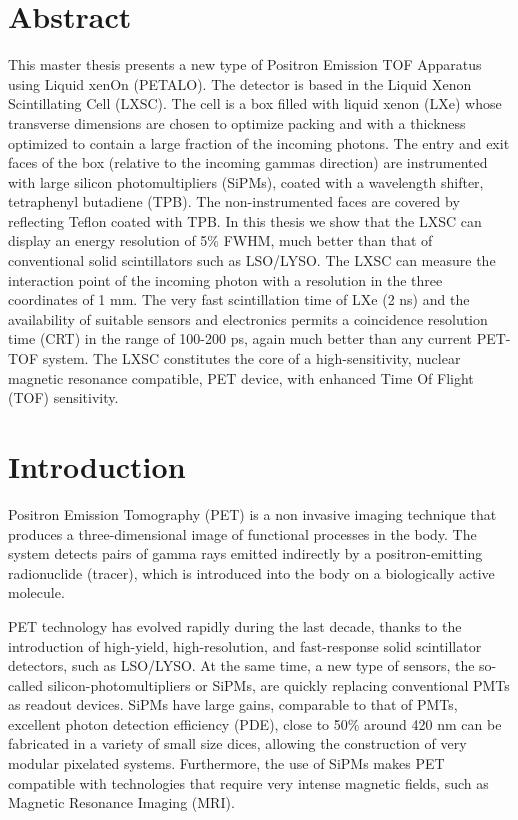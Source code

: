 \documentclass[12pt,a4paper,english,twoside]{article}
\begin{document}
\section*{Abstract}
This master thesis presents a new type of Positron Emission TOF Apparatus using Liquid xenOn (PETALO). The detector is based in the  Liquid Xenon Scintillating Cell (LXSC).  The cell is a box filled with liquid xenon (LXe) whose transverse dimensions are chosen to optimize packing and with a thickness optimized to contain a large fraction of the incoming photons. The entry and exit faces of the box (relative to the incoming gammas direction) are instrumented with large silicon photomultipliers (SiPMs), coated with a wavelength shifter, tetraphenyl butadiene (TPB). The non-instrumented faces are covered by reflecting Teflon coated with TPB. In this thesis we show that the LXSC can display an energy resolution of 5\% FWHM, much better than that of conventional solid scintillators such as LSO/LYSO. The LXSC can measure the interaction point of the incoming photon with a resolution in the three coordinates of 1 mm. The very fast scintillation time of LXe (2 ns) and the availability of suitable sensors and electronics permits a coincidence resolution time (CRT) in the range of 100-200 ps, again much better than any current PET-TOF system. The LXSC constitutes the core of a high-sensitivity, nuclear magnetic resonance compatible, PET device, with enhanced Time Of Flight (TOF) sensitivity.


\newpage\null\thispagestyle{empty}\newpage

\newpage
\thispagestyle{newstyle}
\tableofcontents

\newpage
\thispagestyle{newstyle}


\section{Introduction}
\label{sec.intro}

Positron Emission Tomography (PET) is a non invasive imaging technique that produces a three-dimensional image of functional processes in the body. The system detects pairs of gamma rays emitted indirectly by a positron-emitting radionuclide (tracer), which is introduced into the body on a biologically active molecule. 

PET technology has evolved rapidly during the last decade, thanks to the introduction of high-yield, high-resolution, and fast-response solid scintillator detectors, such as LSO/LYSO. At the same time, a new type of sensors, the so-called silicon-photomultipliers or SiPMs, are quickly replacing conventional PMTs as readout devices. SiPMs have large gains, comparable to that of PMTs, excellent photon detection efficiency (PDE), close to 50\% around 420 nm can be fabricated in a variety of small size dices, allowing the construction of very modular pixelated systems. Furthermore, the use of SiPMs makes PET compatible with technologies that require very intense magnetic fields, such as Magnetic Resonance Imaging (MRI). 
\end{document}
